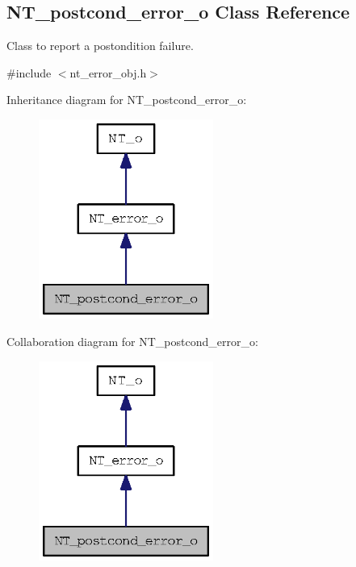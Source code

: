 \subsection{NT\_\-postcond\_\-error\_\-o Class Reference}
\label{class_n_t__postcond__error__o}


Class to report a postondition failure.  




{\ttfamily \#include $<$nt\_\-error\_\-obj.h$>$}



Inheritance diagram for NT\_\-postcond\_\-error\_\-o:
\nopagebreak
\begin{figure}[H]
\begin{center}
\leavevmode
\includegraphics[width=162pt]{class_n_t__postcond__error__o__inherit__graph}
\end{center}
\end{figure}


Collaboration diagram for NT\_\-postcond\_\-error\_\-o:
\nopagebreak
\begin{figure}[H]
\begin{center}
\leavevmode
\includegraphics[width=162pt]{class_n_t__postcond__error__o__coll__graph}
\end{center}
\end{figure}
